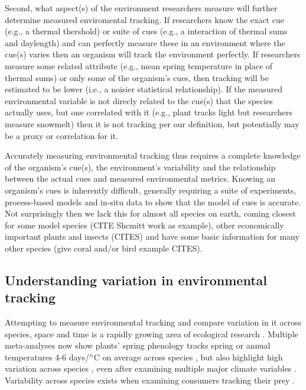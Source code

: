 \documentclass[11pt,letterpaper]{article}
\begin{document}
Second, what aspect(s) of the environment researchers measure will further determine measured enviromental tracking. If researchers know the exact cue (e.g., a thermal thershold) or suite of cues (e.g., a interaction of thermal sums and daylength) and can perfectly measure these in an environment where the cue(s) varies then an organism will track the environment perfectly. If researchers measure some related attribute (e.g., mean spring temperature in place of thermal sums) or only some of the organism's cues, then tracking will be estimated to be lower (i.e., a noisier statistical relationship).  If the measured environmental variable is not direcly related to the cue(s) that the species actually uses, but one correlated with it (e.g., plant tracks light but researchers measure snowmelt) then it is not tracking per our definition, but potentially may be a proxy or correlation for it.

Accurately measuring environmental tracking thus requires a complete knowledge of the organism's cue(s), the environment's variability and the relationship between the actual cues and measured environmental metrics. Knowing an organism's cues is inherently difficult, generally requiring a suite of experiments, process-based models and in-situ data to show that the model of cues is accurate. Not surprisingly then we lack this for almost all species on earth, coming closest for some model species (CITE Shcmitt work as example), other economically important plants and insects (CITES) and have some basic information for many other species (give coral and/or bird example CITES).

\subsection{Understanding variation in environmental tracking}
Attempting to measure environmental tracking and compare variation in it across species, space and time is a rapidly growing area of ecological research \citep[e.g.,]{Cook:2012pnas,fu2015,thackeray2016,cohen2018}. Multiple meta-analyses now show plants' spring phenology tracks spring or annual temperatures 4-6 days/$\degree$C on average across species \citep{Richardson:2006qh,Wolkovich:2012n,thackeray2016}, but also highlight high variation across species  \citep{Cook:2012pnas}, even after examining multiple major climate variables \citep{thackeray2016}. Variability across species exists when examining consumers tracking their prey \citep[across diverse species tracking over time is 6.1 days/decade but ranges from zero to 15 days/decade, see][]{kharouba2018}. 
\end{document}
